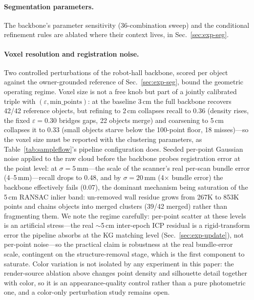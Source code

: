 \paragraph{Segmentation parameters.}
The backbone's parameter sensitivity (36-combination sweep) and the
conditional refinement rules are ablated where their context lives, in
Sec.~\ref{sec:exp-seg}.

\paragraph{Voxel resolution and registration noise.}
Two controlled perturbations of the robot-hall backbone, scored per
object against the owner-grounded reference of
Sec.~\ref{sec:exp-seg}, bound the geometric operating regime. Voxel
size is not a free knob but part of a jointly calibrated triple with
$(\varepsilon, \mathrm{min\_points})$: at the baseline 3\,cm the full
backbone recovers 42/42 reference objects, but refining to 2\,cm
collapses recall to 0.36 (density rises, the fixed
$\varepsilon{=}0.30$ bridges gaps, 22 objects merge) and coarsening to
5\,cm collapses it to 0.33 (small objects starve below the 100-point
floor, 18 misses)---so the voxel size must be reported with the
clustering parameters, as Table~\ref{tab:sampleflow}'s pipeline
configuration does. Seeded per-point Gaussian noise applied to the raw
cloud before the backbone probes registration error at the point
level: at $\sigma{=}5$\,mm---the scale of the scanner's real per-scan
bundle error (4--5\,mm)---recall drops to 0.48, and by
$\sigma{=}20$\,mm (4$\times$ bundle error) the backbone effectively
fails (0.07), the dominant mechanism being saturation of the 5\,cm
RANSAC inlier band: un-removed wall residue grows from 267K to 853K
points and chains objects into merged clusters (39/42 merged) rather
than fragmenting them. We note the regime carefully: per-point scatter
at these levels is an artificial stress---the real $\sim$5\,cm
inter-epoch ICP residual is a rigid-transform error the pipeline
absorbs at the KG matching level (Sec.~\ref{sec:exp-update}), not
per-point noise---so the practical claim is robustness at the real
bundle-error scale, contingent on the structure-removal stage, which
is the first component to saturate. Color variation is not isolated by
any experiment in this paper: the render-source ablation above changes
point density and silhouette detail together with color, so it is an
appearance-quality control rather than a pure photometric one, and a
color-only perturbation study remains open.
